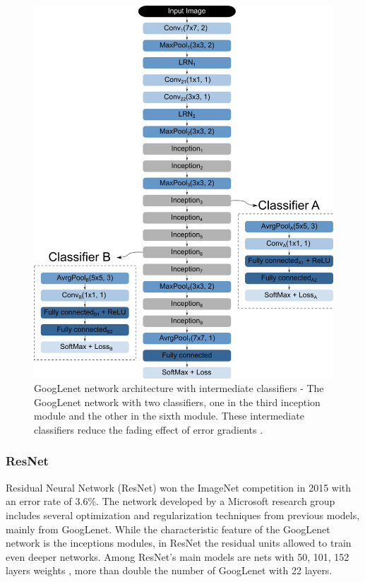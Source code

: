 \begin{figure}
    \centering
    \includegraphics[scale=0.4]{images/figure134.png}
    \caption{GoogLenet network architecture with intermediate classifiers - The GoogLenet network with two classifiers, one in the third inception module and the other in the sixth module. These intermediate classifiers reduce the fading effect of error gradients \cite{img:googlenet}.}
    \label{fig:googlenet2}
\end{figure}

\subsubsection{ResNet}
Residual Neural Network (ResNet) won the ImageNet competition in 2015 with an error rate of 3.6\%. The network developed by a Microsoft research group includes several optimization and regularization techniques from previous models, mainly from GoogLenet. While the characteristic feature of the GoogLenet network is the inceptions modules, in ResNet the residual units allowed to train even deeper networks. Among ResNet's main models are nets with 50, 101, 152 layers weights \cite{elgendy2020}, more than double the number of GoogLenet with 22 layers.

